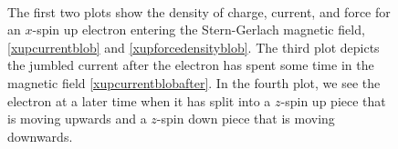 \documentclass[12pt,secnumarabic,amsmath,amssymb,balancelastpage,nofootinbib]{article}
\begin{document}
\begin{figure}[p!]
\\
\vspace*{-4pt}
\caption{The first two plots show the density of charge, current, and force for an $x$-spin up electron entering the Stern-Gerlach magnetic field, \eqref{xupcurrentblob} and \eqref{xupforcedensityblob}.  The third plot depicts the jumbled current after the electron has spent some time in the magnetic field \eqref{xupcurrentblobafter}.  In the fourth plot, we see the electron at a later time when it has split into a $z$-spin up piece that is moving upwards and a $z$-spin down piece that is moving downwards.}
  \label{SG4}
\end{figure}
\end{document}
